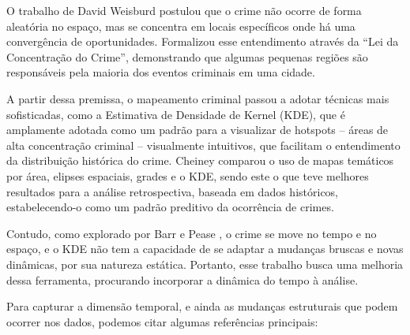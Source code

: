 O trabalho de David Weisburd \cite{Weisburd2015} postulou que o crime não ocorre de forma aleatória no espaço, mas se concentra em locais específicos onde há uma convergência de oportunidades. Formalizou esse entendimento através da ``Lei da Concentração do Crime'', demonstrando que algumas pequenas regiões são responsáveis pela maioria dos eventos criminais em uma cidade.

A partir dessa premissa, o mapeamento criminal passou a adotar técnicas mais sofisticadas, como a Estimativa de Densidade de Kernel (KDE), que é amplamente adotada como um padrão para a visualizar de hotspots -- áreas de alta concentração criminal -- visualmente intuitivos, que facilitam o entendimento da distribuição histórica do crime. Cheiney \cite{Chainey2008} comparou o uso de mapas temáticos por área, elipses espaciais, grades e o KDE, sendo este o que teve melhores resultados para a análise retrospectiva, baseada em dados históricos, estabelecendo-o como um padrão preditivo da ocorrência de crimes.

Contudo, como explorado por Barr e Pease \cite{Barr1990}, o crime se move no tempo e no espaço, e o KDE não tem a capacidade de se adaptar a mudanças bruscas e novas dinâmicas, por sua natureza estática. Portanto, esse trabalho busca uma melhoria dessa ferramenta, procurando incorporar a dinâmica do tempo à análise.

Para capturar a dimensão temporal, e ainda as mudanças estruturais que podem ocorrer nos dados, podemos citar algumas referências principais:

